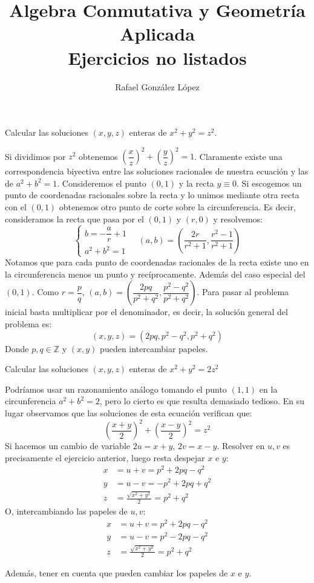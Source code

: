 \documentclass[twoside]{article}
\begin{document}
\title{Algebra Conmutativa y Geometría Aplicada\\
\large Ejercicios no listados}

\author{Rafael González López}
\maketitle

\begin{ejercicio}{1}
Calcular las soluciones $(x,y,z)$ enteras de $x^2+y^2=z^2$.
\begin{solucion}
Si dividimos por $z^2$ obtenemos $\left(\dfrac{x}{z}\right)^2+\left(\dfrac{y}{z}\right)^2=1$. Claramente existe una correspondencia biyectiva entre las soluciones racionales de nuestra ecuación y las de $a^2+b^2=1$. Consideremos el punto $(0,1)$ y la recta $y\equiv 0$. Si escogemos un punto de coordenadas racionales sobre la recta y lo unimos mediante otra recta con el $(0,1)$ obtenemos otro punto de corte sobre la circunferencia. Es decir, consideramos la recta que pasa por el $(0,1)$ y $(r,0)$ y resolvemos:
\[\begin{cases}
b=-\dfrac{a}{r}+1\\
a^2+b^2=1
\end{cases} \quad (a,b) = \left(\dfrac{2r}{r^2+1},\frac{r^2-1}{r^2+1}\right)
\]
Notamos que para cada punto de coordenadas racionales de la recta existe uno en la circunferencia menos un punto y recíprocamente. Además del caso especial del $(0,1)$. Como $r=\dfrac{p}{q}$, $(a,b)=\left(\dfrac{2pq}{p^2+q^2},\dfrac{p^2-q^2}{p^2+q^2}\right)$. Para pasar al problema inicial basta multiplicar por el denominador, es decir, la solución general del problema es:
\[(x,y,z)= \left(2pq,{p^2-q^2},{p^2+q^2}\right)\]
Donde $p,q\in\mathbb{Z}$ y $(x,y)$ pueden intercambiar papeles.
\end{solucion}
\end{ejercicio}
\newpage
\begin{ejercicio}{2}
Calcular las soluciones $(x,y,z)$ enteras de $x^2+y^2=2z^2$
\begin{solucion}
Podríamos usar un razonamiento análogo tomando el punto $(1,1)$ en la circunferencia $a^2+b^2=2$, pero lo cierto es que resulta demasiado tedioso. En su lugar observamos que las soluciones de esta ecuación verifican que:
\[
\left(\frac{x+y}{2}\right)^2+\left(\frac{x-y}{2}\right)^2=z^2
\]
Si hacemos un cambio de variable $2u=x+y$, $2v = x-y$. Resolver en $u,v$ es precisamente el ejercicio anterior, luego resta despejar $x$ e $y$:
\begin{align*}
x &= u + v = p^2+2pq -q^2\\
y &= u - v = - p^2+ 2pq +q^2\\
z &= \frac{\sqrt{x^2+y^2}}{2} =  p^2+q^2
\end{align*}
O, intercambiando las papeles de $u,v$: 
\begin{align*}
x &= u + v = p^2+2pq -q^2\\
y &= u - v =  p^2-2pq -q^2\\
z &= \frac{\sqrt{x^2+y^2}}{2} =  p^2+q^2
\end{align*}
\end{solucion}
Además, tener en cuenta que pueden cambiar los papeles de $x$ e $y$.
\end{ejercicio}
\end{document}
